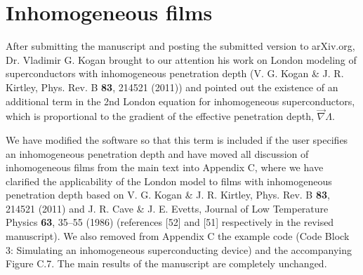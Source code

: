 \documentclass{article} %
\begin{document}
\section{Inhomogeneous films}

After submitting the manuscript and posting the submitted version to arXiv.org, Dr. Vladimir G. Kogan brought to our attention his work on London modeling of superconductors with inhomogeneous penetration depth (V. G. Kogan \& J. R. Kirtley, Phys. Rev. B {\bf 83}, 214521 (2011)) and pointed out the existence of an additional term in the 2nd London equation for inhomogeneous superconductors, which is proportional to the gradient of the effective penetration depth, $\vec{\nabla}\Lambda$.

We have modified the software so that this term is included if the user specifies an inhomogeneous penetration depth and have moved all discussion of inhomogeneous films from the main text into Appendix C, where we have clarified the applicability of the London model to films with inhomogeneous penetration depth based on V. G. Kogan \& J. R. Kirtley, Phys. Rev. B {\bf 83}, 214521 (2011) and J. R. Cave \& J. E. Evetts, Journal of Low Temperature Physics {\bf 63}, 35–55 (1986) (references [52] and [51] respectively in the revised manuscript). We also removed from Appendix C the example code (Code Block 3: Simulating an inhomogeneous superconducting device) and the accompanying Figure C.7. The main results of the manuscript are completely unchanged.
\end{document}
